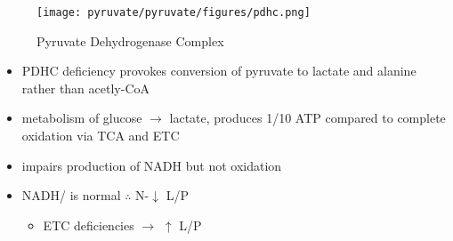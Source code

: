 \documentclass{scrartcl}
\begin{document}
\begin{figure}[htbp]
\centering
\texttt{[image: pyruvate/pyruvate/figures/pdhc.png]}
\caption[pdhc]{\label{fig:org240f8d4}Pyruvate Dehydrogenase Complex}
\end{figure}

\begin{itemize}
\item PDHC deficiency provokes conversion of pyruvate to lactate and alanine rather than acetly-CoA
\item metabolism of glucose \(\to\) lactate, produces 1/10 ATP compared to
complete oxidation via TCA and ETC
\item impairs production of NADH but not oxidation
\item NADH/ is normal \(\therefore\) N-\(\downarrow\) L/P
\begin{itemize}
\item ETC deficiencies \(\to\) \(\uparrow\) L/P
\end{itemize}
\end{itemize}
\end{document}
